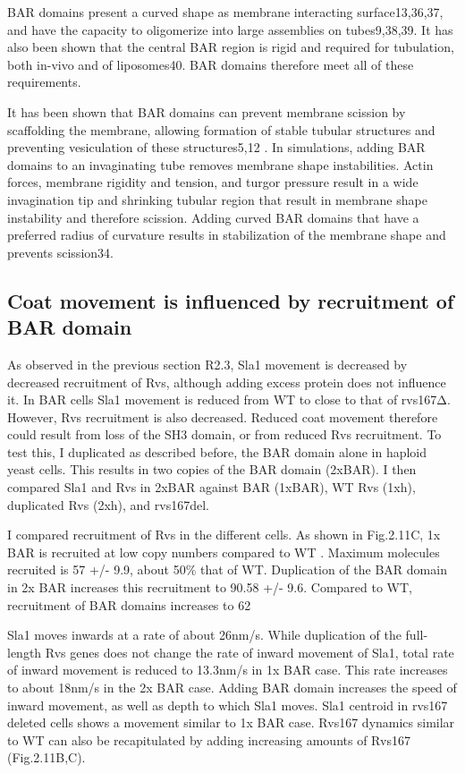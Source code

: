 BAR domains present a curved shape as membrane interacting surface13,36,37, and have the capacity to oligomerize into large assemblies on tubes9,38,39. It has also been shown that the central BAR region is rigid and required for tubulation, both in-vivo and of liposomes40. BAR domains therefore meet all of these requirements. 
	
It has been shown that BAR domains can prevent membrane scission by scaffolding the membrane, allowing formation of stable tubular structures and preventing vesiculation of these structures5,12 . In simulations, adding BAR domains to an invaginating tube removes membrane shape instabilities. Actin forces, membrane rigidity and tension, and turgor pressure result in a wide invagination tip and shrinking tubular region that result in membrane shape instability and therefore scission. Adding curved BAR domains that have a preferred radius of curvature results in stabilization of the membrane shape and prevents scission34.

	\subsection{Coat movement is influenced by recruitment of BAR domain }
As observed in the previous section R2.3, Sla1 movement is decreased by decreased recruitment of Rvs, although adding excess protein does not influence it. In BAR cells Sla1 movement is reduced from WT to close to that of rvs167Δ. However, Rvs recruitment is also decreased. Reduced coat movement therefore could result from loss of the SH3 domain, or from reduced Rvs recruitment. To test this, I duplicated as described before, the BAR domain alone in haploid yeast cells. This results in two copies of the BAR domain (2xBAR). I then compared Sla1 and Rvs  in 2xBAR against BAR (1xBAR), WT Rvs (1xh), duplicated Rvs (2xh), and rvs167del.

I compared recruitment of Rvs in the different cells. As shown in Fig.2.11C, 1x BAR is recruited at low copy numbers compared to WT . Maximum molecules recruited is 57 +/- 9.9, about 50\% that of WT. Duplication of the BAR domain in 2x BAR increases this recruitment to 90.58 +/- 9.6. Compared to WT, recruitment of BAR domains increases to 62%

Sla1 moves inwards at a rate of about 26nm/s. While duplication of the full-length Rvs genes does not change the rate of inward movement of Sla1, total rate of inward movement is reduced to 13.3nm/s in 1x BAR case. This rate increases to about 18nm/s in the 2x BAR case. Adding BAR domain increases the speed of inward movement, as well as depth to which Sla1 moves. Sla1 centroid in rvs167 deleted cells shows a movement similar to 1x BAR case. Rvs167 dynamics similar to WT can also be recapitulated by adding increasing amounts of Rvs167 (Fig.2.11B,C).

